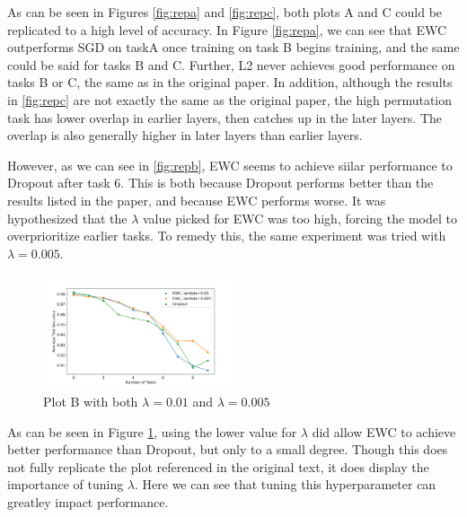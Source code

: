 \documentclass{article}
\begin{document}
As can be seen in Figures \ref{fig:repa} and \ref{fig:repc}, both plots A and C could be replicated to a high level of accuracy. In Figure \ref{fig:repa}, we can see that EWC outperforms SGD on taskA once training on task B begins training, and the same could be said for tasks B and C. Further, L2 never achieves good performance on tasks B or C, the same as in the original paper. In addition, although the results in \ref{fig:repc} are not exactly the same as the original paper, the high permutation task has lower overlap in earlier layers, then catches up in the later layers. The overlap is also generally higher in later layers than earlier layers.

However, as we can see in \ref{fig:repb}, EWC seems to achieve siilar performance to Dropout after task 6. This is both because Dropout performs better than the results listed in the paper, and because EWC performs worse. It was hypothesized that the $\lambda$ value picked for EWC was too high, forcing the model to overprioritize earlier tasks. To remedy this, the same experiment was tried with $\lambda=0.005$.

\begin{figure}[!h]
\centering
\includegraphics[width=0.5\textwidth]{../Figures/Plot_b2.jpg}
\caption{Plot B with both $\lambda=0.01$ and $\lambda=0.005$}
\label{fig:repb2}
\end{figure}

As can be seen in Figure \ref{fig:repb2}, using the lower value for $\lambda$ did allow EWC to achieve better performance than Dropout, but only to a small degree. Though this does not fully replicate the plot referenced in the original text, it does display the importance of tuning $\lambda$. Here we can see that tuning this hyperparameter can greatley impact performance. 






\end{document}
